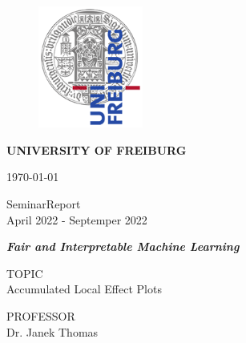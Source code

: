 \thispagestyle{empty}
	
	\begin{figure}[H]
		   	          \includegraphics[height=4cm]{images/ufreiburg_logo1.png}
			          \label{Logo_ENESJ}
	        \endminipage
	\end{figure}
	
    \begin{center}
    	\vspace{1cm}
    	\huge
	    \textbf{UNIVERSITY OF FREIBURG}
	
	
    	\vspace{1cm}
    	\large
    	\today
	
    	\vspace{0.2cm}
    	\large
    	SeminarReport\\
    	April 2022 - Septemper 2022
	
    	\vspace{1.5cm}	
    	\huge
    	\textit{\textbf{Fair and Interpretable Machine Learning}}

	    \vspace{1.5cm}
    	\normalsize	
    	\vspace{0.3cm}
    	\large
    	\yourname
	
        \vspace{0.4cm}
        \normalsize
        TOPIC\\
        \vspace{.3cm}
        \large
        Accumulated Local Effect Plots
	
    	\vspace{0.5cm}
    	\normalsize
    	PROFESSOR\\
    	\vspace{.2cm}
    	\large
        Dr. Janek Thomas
        
    \end{center}
	
\newpage
{}
\rhead{} %

